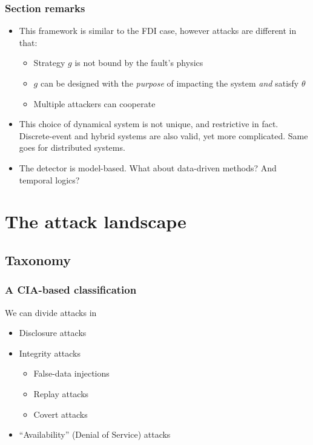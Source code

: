 \documentclass[presentation]{beamer}
\begin{document}
\begin{frame}
	\frametitle{Section remarks}
	\begin{itemize}
		\setlength{\itemsep}{2ex}
		\item<1-> This framework is similar to the FDI case, however attacks are different in that:
		\begin{itemize}
			\item Strategy $g$ is not bound by the fault's physics
			\item $g$ can be designed with the \emph{purpose} of impacting the system \emph{and} satisfy $\theta$
			\item Multiple attackers can cooperate
		\end{itemize}

		\item<2-> This choice of dynamical system is not unique, and restrictive in fact. 
		Discrete-event and hybrid systems are also valid, yet more complicated.
		Same goes for distributed systems.
	
		\item<3> The detector is model-based. What about data-driven methods? And temporal logics? 
	\end{itemize}
\end{frame}

\section*{The attack landscape}


\subsection{Taxonomy}

\begin{frame}
	\frametitle{A CIA-based classification}

	We can divide attacks in
	\smallskip
	\begin{itemize}
		\setlength{\itemsep}{2ex}
		\item Disclosure attacks
		\item Integrity attacks
		\begin{itemize}
			\item False-data injections
			\item Replay attacks
			\item Covert attacks
		\end{itemize}
		\item ``Availability'' (Denial of Service) attacks
	\end{itemize}	
\end{frame}
\end{document}
